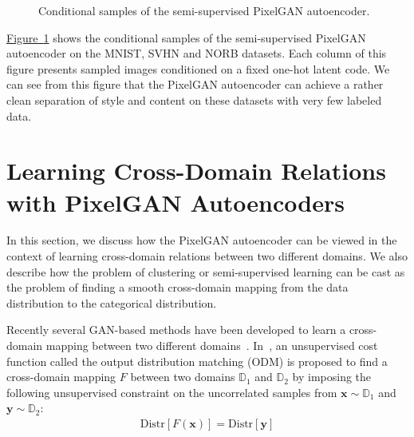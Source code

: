 \documentclass{article}
\newcommand{\myfig}[1]{\hyperref[fig:#1]{Figure~\ref*{fig:#1}}}
\begin{document}
\begin{figure}[b]
\centering
\hspace*{2.2cm}
\hspace*{2.2cm}
\hspace*{.7cm}
\vspace{-.3cm}
\caption{\label{fig:disentangle}Conditional samples of the semi-supervised PixelGAN autoencoder.}
\end{figure}


\myfig{disentangle} shows the conditional samples of the semi-supervised PixelGAN autoencoder on the MNIST, SVHN and NORB datasets. Each column of this figure presents sampled images conditioned on a fixed one-hot latent code. We can see from this figure that the PixelGAN autoencoder can achieve a rather clean separation of style and content on these datasets with very few labeled data.


\section{Learning Cross-Domain Relations with PixelGAN Autoencoders}\label{sec:cross-domain}


In this section, we discuss how the PixelGAN autoencoder can be viewed in the context of learning cross-domain relations between two different domains. We also describe how the problem of clustering or semi-supervised learning can be cast as the problem of finding a smooth cross-domain mapping from the data distribution to the categorical distribution. 

Recently several GAN-based methods have been developed to learn a cross-domain mapping between two different domains~\citep{discogan,cyclegan,cross-domain-ilya,aae,cross-domain-nlp}. In~\citep{cross-domain-ilya}, an unsupervised cost function called the output distribution matching (ODM) is proposed to find a cross-domain mapping $F$ between two domains $\mathbb{D}_1$ and $\mathbb{D}_2$ by imposing the following unsupervised constraint on the uncorrelated samples from $\mathbf{x} \sim \mathbb{D}_1$ and $\mathbf{y} \sim \mathbb{D}_2$: 
\begin{align}
\text{Distr}[F(\mathbf{x})] = \text{Distr}[\mathbf{y}] \label{eq:odm}
\end{align}
\end{document}
